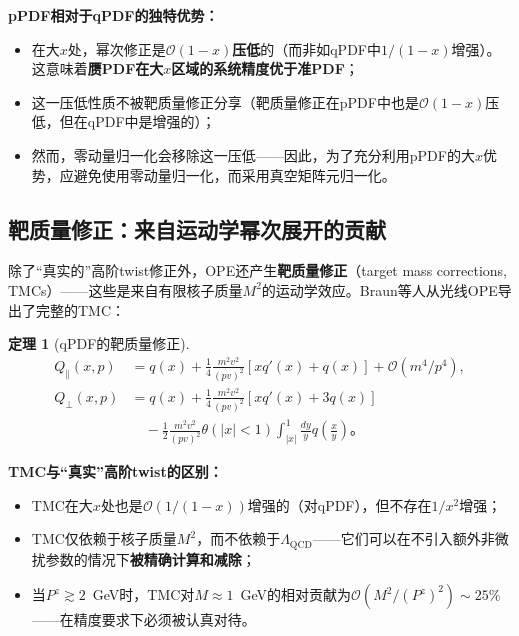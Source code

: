 \documentclass[12pt,a4paper]{ctexart}
\theoremstyle{definition}
\newtheorem{theorem}{定理}[section]
\begin{document}
\textbf{pPDF相对于qPDF的独特优势：}
\begin{itemize}
    \item 在大$x$处，幂次修正是$\mathcal{O}(1-x)$\textbf{压低}的（而非如qPDF中$1/(1-x)$增强）。这意味着\textbf{赝PDF在大$x$区域的系统精度优于准PDF}；
    \item 这一压低性质不被靶质量修正分享（靶质量修正在pPDF中也是$\mathcal{O}(1-x)$压低，但在qPDF中是增强的）；
    \item 然而，零动量归一化会移除这一压低——因此，为了充分利用pPDF的大$x$优势，应避免使用零动量归一化，而采用真空矩阵元归一化。
\end{itemize}

\subsection{靶质量修正：来自运动学幂次展开的贡献}

除了``真实的''高阶twist修正外，OPE还产生\textbf{靶质量修正}（target mass corrections, TMCs）——这些是来自有限核子质量$M^2$的运动学效应。Braun等人\cite{Braun2019power}从光线OPE导出了完整的TMC：

\begin{theorem}[qPDF的靶质量修正]\cite{Braun2019power}
\begin{equation}
\begin{aligned}
Q_\parallel(x, p) &= q(x) + \frac{1}{4}\frac{m^2 v^2}{(pv)^2} [x q'(x) + q(x)] + \mathcal{O}(m^4/p^4), \\
Q_\perp(x, p) &= q(x) + \frac{1}{4}\frac{m^2 v^2}{(pv)^2} [x q'(x) + 3q(x)] \\
&\quad - \frac{1}{2}\frac{m^2 v^2}{(pv)^2} \theta(|x| < 1) \int_{|x|}^1 \frac{dy}{y} q\left(\frac{x}{y}\right)。
\end{aligned}
\label{eq:TMC_qPDF}
\end{equation}
\end{theorem}

\textbf{TMC与``真实''高阶twist的区别：}
\begin{itemize}
    \item TMC在大$x$处也是$\mathcal{O}(1/(1-x))$增强的（对qPDF），但不存在$1/x^2$增强；
    \item TMC仅依赖于核子质量$M^2$，而不依赖于$\Lambda_{\text{QCD}}$——它们可以在不引入额外非微扰参数的情况下\textbf{被精确计算和减除}；
    \item 当$P^z \gtrsim 2$~GeV时，TMC对$M \approx 1$~GeV的相对贡献为$\mathcal{O}(M^2/(P^z)^2) \sim 25\%$——在精度要求下必须被认真对待。
\end{itemize}
\end{document}
